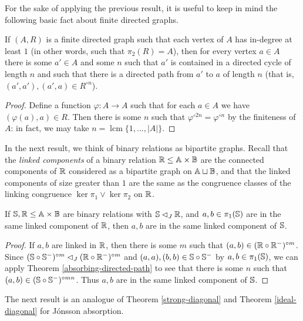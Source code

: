 \documentclass[letterpaper,11pt]{article}
\DeclareMathOperator{\lcm}{lcm}
\begin{document}
For the sake of applying the previous result, it is useful to keep in mind the following basic fact about finite directed graphs.

\begin{prop} If $(A,R)$ is a finite directed graph such that each vertex of $A$ has in-degree at least $1$ (in other words, such that $\pi_2(R) = A$), then for every vertex $a \in A$ there is some $a' \in A$ and some $n$ such that $a'$ is contained in a directed cycle of length $n$ and such that there is a directed path from $a'$ to $a$ of length $n$ (that is, $(a',a'), (a',a) \in R^{\circ n}$).
\end{prop}
\begin{proof} Define a function $\varphi : A \rightarrow A$ such that for each $a \in A$ we have $(\varphi(a),a) \in R$. Then there is some $n$ such that $\varphi^{\circ 2n} = \varphi^{\circ n}$ by the finiteness of $A$: in fact, we may take $n = \lcm\{1, ..., |A|\}$.
\end{proof}

In the next result, we think of binary relations as bipartite graphs. Recall that the \emph{linked components} of a binary relation $\mathbb{R} \le \mathbb{A} \times \mathbb{B}$ are the connected components of $\mathbb{R}$ considered as a bipartite graph on $\mathbb{A} \sqcup \mathbb{B}$, and that the linked components of size greater than $1$ are the same as the congruence classes of the linking congruence $\ker \pi_1 \vee \ker \pi_2$ on $\mathbb{R}$.

\begin{thm}\label{absorbing-linked} If $\mathbb{S}, \mathbb{R} \le \mathbb{A} \times \mathbb{B}$ are binary relations with $\mathbb{S} \lhd_J \mathbb{R}$, and $a,b \in \pi_1(\mathbb{S})$ are in the same linked component of $\mathbb{R}$, then $a,b$ are in the same linked component of $\mathbb{S}$.
\end{thm}
\begin{proof} If $a,b$ are linked in $\mathbb{R}$, then there is some $m$ such that $(a,b) \in (\mathbb{R} \circ \mathbb{R}^{-})^{\circ m}$. Since $(\mathbb{S} \circ \mathbb{S}^{-})^{\circ m} \lhd_J (\mathbb{R} \circ \mathbb{R}^{-})^{\circ m}$ and $(a,a), (b,b) \in \mathbb{S} \circ \mathbb{S}^-$ by $a,b \in \pi_1(\mathbb{S})$, we can apply Theorem \ref{absorbing-directed-path} to see that there is some $n$ such that $(a,b) \in (\mathbb{S} \circ \mathbb{S}^{-})^{\circ mn}$. Thus $a,b$ are in the same linked component of $\mathbb{S}$.
\end{proof}

The next result is an analogue of Theorem \ref{strong-diagonal} and Theorem \ref{ideal-diagonal} for J\'onsson absorption.
\end{document}
